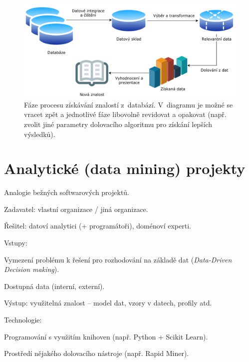 \begin{figure}[H]
    \centering
    \includegraphics[width=1\linewidth]{knowledge_discovery_diagram.pdf}
    \caption{Fáze procesu získávání znalostí z~databází. V~diagramu je možné se vracet zpět a jednotlivé fáze libovolně revidovat a opakovat (např. zvolit jiné parametry dolovacího algoritmu pro získání lepších výsledků).}
\end{figure}


\section{Analytické (data mining) projekty}

\begin{compactitem}
    \item Analogie bežných softwarových projektů.
    \item Zadavatel: vlastní organizace / jiná organizace.
    \item Řešitel: datoví analytici (+ programátoři), doménoví experti.
    \item Vstupy: \begin{compactitem}
        \item Vymezení problému k řešení pro rozhodování na základě dat (\textit{Data-Driven Decision making}).
        \item Dostupná data (interní, externí).
    \end{compactitem}
    \item Výstup: využitelná znalost -- model dat, vzory v datech, profily atd.
    \item Technologie: \begin{compactitem}
        \item Programování s využitím knihoven (např. Python + Scikit Learn).
        \item Prostředí nějakého dolovacího nástroje (např. Rapid Miner).
    \end{compactitem}
\end{compactitem}

